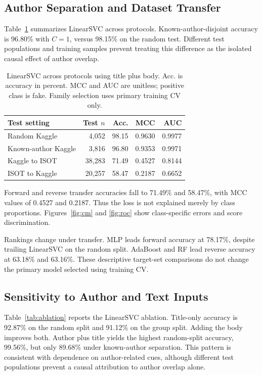 \documentclass[conference]{IEEEtran}
\begin{document}
\subsection{Author Separation and Dataset Transfer}
Table~\ref{tab:general} summarizes LinearSVC across protocols. Known-author-disjoint accuracy is 96.80\% with $C=1$, versus 98.15\% on the random test. Different test populations and training samples prevent treating this difference as the isolated causal effect of author overlap.

\begin{table}[t]
\caption{LinearSVC across protocols using title plus body. Acc. is accuracy in percent. MCC and AUC are unitless; positive class is fake. Family selection uses primary training CV only.}
\label{tab:general}\centering\small
\begin{tabular}{lrrrr}\toprule
Test setting & Test $n$ & Acc. & MCC & AUC\\\midrule
Random Kaggle & 4,052 & 98.15 & 0.9630 & 0.9977\\
Known-author Kaggle & 3,816 & 96.80 & 0.9353 & 0.9971\\
Kaggle to ISOT & 38,283 & 71.49 & 0.4527 & 0.8144\\
ISOT to Kaggle & 20,257 & 58.47 & 0.2187 & 0.6652\\\bottomrule
\end{tabular}
\end{table}

Forward and reverse transfer accuracies fall to 71.49\% and 58.47\%, with MCC values of 0.4527 and 0.2187. Thus the loss is not explained merely by class proportions. Figures~\ref{fig:cm} and \ref{fig:roc} show class-specific errors and score discrimination.



Rankings change under transfer. MLP leads forward accuracy at 78.17\%, despite trailing LinearSVC on the random split. AdaBoost and RF lead reverse accuracy at 63.18\% and 63.16\%. These descriptive target-set comparisons do not change the primary model selected using training CV.

\subsection{Sensitivity to Author and Text Inputs}
Table~\ref{tab:ablation} reports the LinearSVC ablation. Title-only accuracy is 92.87\% on the random split and 91.12\% on the group split. Adding the body improves both. Author plus title yields the highest random-split accuracy, 99.56\%, but only 89.68\% under known-author separation. This pattern is consistent with dependence on author-related cues, although different test populations prevent a causal attribution to author overlap alone.
\end{document}
